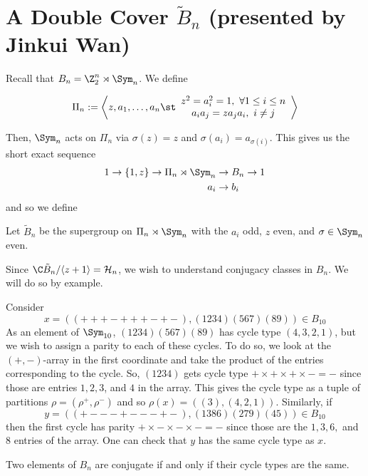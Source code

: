 \documentclass[11pt,leqno,oneside]{amsbook}
\renewcommand{\H}{\mathcal{H}}
\numberwithin{thm}{section}
\begin{document}
\section{A Double Cover \(\tilde{B}_n\) (presented by Jinkui Wan)}
Recall that \(B_n = \Z_2^n \rtimes \Sym_n\). We define
\begin{defn}
  \[
    \Pi_n := \left\langle z,a_1,\ldots,a_n \st
    \begin{array}{c}
      z^2 = a_i^2 = 1, \ \forall 1 \leq i \leq n \\
      a_i a_j = z a_j a_i, \ i \neq j
    \end{array}
\right\rangle
  \]
\end{defn}
Then, \(\Sym_n\) acts on \(\Pi_n\) via \(\sigma(z) = z\) and
\(\sigma(a_i) = a_{\sigma(i)}\). This gives us the short exact
sequence
\begin{align*}
  1 \to \{1,z\} \to \Pi_n \rtimes \Sym_n & \to B_n \to 1\\
  a_i & \to b_i
\end{align*}
and so we define 
\begin{defn}
  Let \(\tilde{B}_n\) be the supergroup on \(\Pi_n \rtimes \Sym_n\)
  with the \(a_i\) odd, \(z\) even, and \(\sigma \in \Sym_n\) even.
\end{defn}
Since \(\C\tilde{B}_n/ \langle z+1 \rangle = \H_n\), we wish to
understand conjugacy classes in \(B_n\). We will do so by example.
\begin{example}
  Consider \[
    x = ((+++-+++-+-),(1234)(567)(89)) \in B_{10}
  \]
  As an element of \(\Sym_{10}\), \((1234)(567)(89)\) has cycle type
  \((4,3,2,1)\), but we wish to assign a parity to each of these
  cycles. To do so, we look at the \((+,-)\)-array in the first
  coordinate and take the product of the entries corresponding to the
  cycle. So, \((1234)\) gets cycle type \(+ \times + \times + \times
  - = -\) since those are entries \(1,2,3\), and \(4\) in the
  array. This gives the cycle type as a tuple of partitions \(\rho =
  (\rho^+, \rho^-)\) and so \(\rho(x) = ((3),(4,2,1))\). Similarly,
  if \[
    y = ((+---+---+-),(1386)(279)(45)) \in B_{10}
  \]
  then the first cycle has parity \(+ \times - \times - \times - = -\)
  since those are the \(1,3,6,\) and \(8\) entries of the array. One
  can check that \(y\) has the same cycle type as \(x\).
\end{example}
\begin{lem}
  Two elements of \(B_n\) are conjugate if and only if their cycle
  types are the same.
\end{lem}
\end{document}
